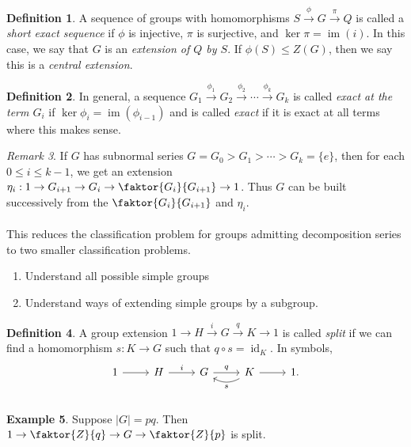\documentclass[10pt,letterpaper,cm]{nupset}
\theoremstyle{definition}
\newtheorem{definition}{Definition}[subsection]
\newtheorem{exmp}[definition]{Example}
\theoremstyle{theorem}
\theoremstyle{remark}
\newtheorem{remark}[definition]{Remark}
\newcommand{\1}{\mathbf{1}}
\newcommand{\0}{\vec 0}
\DeclareMathOperator{\id}{id}
\DeclareMathOperator{\im}{im}
\begin{document}
\begin{definition}
A sequence of groups with homomorphisms $S \overset{\phi}{\to} G \overset{\pi}{\to} Q$ is called a \textit{short exact sequence} if $\phi$ is injective, $\pi$ is surjective, and $\ker \pi = \im(i)$. In this case, we say that $G$ is an \textit{extension of $Q$ by $S$}. If $\phi(S) \leq Z(G)$, then we say this is a \textit{central extension}.
\end{definition}

\begin{definition}
In general, a sequence $G_1 \overset{\phi_1}{\to} G_2 \overset{\phi_2}{\to} \cdots \overset{\phi_k}{\to} G_k$ is called \textit{exact at the term $G_i$} if $\ker \phi_i = \im(\phi_{i-1})$ and is called \textit{exact} if it is exact at all terms where this makes sense.
\end{definition}

\begin{remark}
If $G$ has subnormal series $G = G_0 > G_1 > \cdots > G_k = \{e\}$, then for each $0 \leq i \leq k-1$, we get an extension $\eta_i : 1 \to G_{i+1} \to G_i \to \faktor{G_i}{G_{i+1}} \to 1$. Thus $G$ can be built successively from the $\faktor{G_i}{G_{i+1}}$ and $\eta_i$.
\\ \\ This reduces the classification problem for groups admitting decomposition series to two smaller classification problems.
\begin{enumerate}
\item Understand all possible simple groups
\item Understand ways of extending simple groups by a subgroup.
\end{enumerate}
\end{remark}

\begin{definition}
A group extension $1 \to H  \overset{i}{\to} G \overset{q}{\to} K \to 1$ is called \textit{split} if we can find a homomorphism $s : K \to G$ such that $q \circ s = \id_K$. In symbols, \[
	\begin{tikzcd}
	1\rar & H\rar["i" above] & G\rar["q" above] & K\rar\lar[bend left=30,"s" below] & 1. \\
	\end{tikzcd}
\]
\end{definition}

\begin{exmp}
Suppose $|G|= pq$. Then $1 \to \faktor{Z}{q} \to G \to \faktor{Z}{p}$ is split.
\end{exmp}
\end{document}
